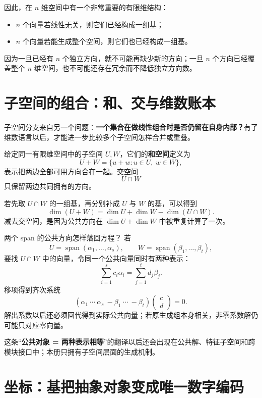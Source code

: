 \documentclass[11pt,a4paper]{ctexart}
\newcommand{\kw}[1]{\textbf{\color{deep}#1}}
\begin{document}
因此，在 $n$ 维空间中有一个非常重要的有限维结构：

\begin{itemize}
  \item $n$ 个向量若线性无关，则它们已经构成一组基；
  \item $n$ 个向量若能生成整个空间，则它们也已经构成一组基。
\end{itemize}

因为一旦已经有 $n$ 个独立方向，就不可能再缺少新的方向；一旦 $n$ 个方向已经覆盖整个 $n$ 维空间，也不可能还存在冗余而不降低独立方向数。

\section{子空间的组合：和、交与维数账本}

子空间分支来自另一个问题：\kw{一个集合在做线性组合时是否仍留在自身内部？}有了维数语言以后，才能进一步比较多个子空间怎样合并或重叠。

给定同一有限维空间中的子空间 $U,W$，它们的\kw{和空间}定义为
\[
U+W=\{u+w:u\in U,\ w\in W\},
\]
表示把两边全部可用方向合在一起。交空间
\[
U\cap W
\]
只保留两边共同拥有的方向。

若先取 $U\cap W$ 的一组基，再分别补成 $U$ 与 $W$ 的基，可以得到
\[
\boxed{
\dim(U+W)=\dim U+\dim W-\dim(U\cap W).
}
\]
减去交空间，是因为公共方向在 $\dim U+\dim W$ 中被重复计算了一次。

\begin{methodbox}{两个 span 的公共方向怎样落回方程？}
若
\[
U=\operatorname{span}(\alpha_1,\dots,\alpha_s),
\qquad
W=\operatorname{span}(\beta_1,\dots,\beta_t),
\]
要找 $U\cap W$ 中的向量，令同一个公共向量同时有两种表示：
\[
\sum_{i=1}^{s}c_i\alpha_i
=
\sum_{j=1}^{t}d_j\beta_j.
\]
移项得到齐次系统
\[
(\alpha_1\ \cdots\ \alpha_s\ -\beta_1\ \cdots\ -\beta_t)
\begin{pmatrix}c\\d\end{pmatrix}=0.
\]
解出系数以后还必须回代得到实际公共向量；若原生成组本身相关，非零系数解仍可能只对应零向量。
\end{methodbox}

这条“\kw{公共对象 = 两种表示相等}”的翻译以后还会出现在公共解、特征子空间和跨模块接口中；本册只拥有子空间层面的生成机制。

\section{坐标：基把抽象对象变成唯一数字编码}
\end{document}
